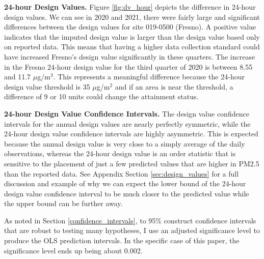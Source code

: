 \documentclass[12pt]{article}
\begin{document}
\noindent\textbf{24-hour Design Values.} Figure \ref{fig:dv_hour} depicts the difference in 24-hour design values. We can see in 2020 and 2021, there were fairly large and significant differences between the design values for site 019-0500 (Fresno). A positive value indicates that the imputed design value is larger than the design value based only on reported data. This means that having a higher data collection standard could have increased Fresno's design value significantly in these quarters. The increase in the Fresno 24-hour design value for the third quarter of 2020 is between 8.55 and 11.7 $\mu$g/m$^3$. This represents a meaningful difference because the 24-hour design value threshold is 35 $\mu$g/m$^2$ and if an area is near the threshold, a difference of 9 or 10 units could change the attainment status.


\noindent\textbf{24-hour Design Value Confidence Intervals.}
The design value confidence intervals for the annual design values are nearly perfectly symmetric, while the 24-hour design value confidence intervals are highly asymmetric. This is expected because the annual design value is very close to a simply average of the daily observations, whereas the 24-hour design value is an order statistic that is sensitive to the placement of just a few predicted values that are higher in PM2.5 than the reported data. See Appendix Section \ref{sec:design_values} for a full discussion and example of why we can expect the lower bound of the 24-hour design value confidence interval to be much closer to the predicted value while the upper bound can be further away.

As noted in Section \ref{confidence_intervals}, to 95\% construct confidence intervals that are robust to testing many hypotheses, I use an adjusted significance level to produce the OLS prediction intervals. In the specific case of this paper, the significance level ends up being about 0.002.

\FloatBarrier
\end{document}
